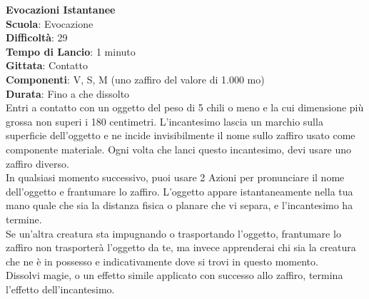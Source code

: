 \begin{multicols}{2}
\medskip\textbf{Evocazioni Istantanee}\\
\textbf{Scuola}: Evocazione\\
\textbf{Difficoltà}: 29\\
\textbf{Tempo di Lancio}: 1 minuto\\
\textbf{Gittata}: Contatto\\
\textbf{Componenti}: V, S, M (uno zaffiro del valore di 1.000 mo)\\
\textbf{Durata}: Fino a che dissolto \\
Entri a contatto con un oggetto del peso di 5 chili o meno e la cui dimensione più grossa non superi i 180 centimetri. L'incantesimo lascia un marchio sulla superficie dell'oggetto e ne incide invisibilmente il nome sullo zaffiro usato come componente materiale. Ogni volta che lanci questo incantesimo, devi usare uno zaffiro diverso.\\
In qualsiasi momento successivo, puoi usare 2 Azioni per pronunciare il nome dell'oggetto e frantumare lo zaffiro. L'oggetto appare istantaneamente nella tua mano quale che sia la distanza fisica o planare che vi separa, e l'incantesimo ha termine.\\
Se un'altra creatura sta impugnando o trasportando l'oggetto, frantumare lo zaffiro non trasporterà l'oggetto da te, ma invece apprenderai chi sia la creatura che ne è in possesso e indicativamente dove si trovi in questo momento.\\
Dissolvi magie, o un effetto simile applicato con successo allo zaffiro, termina l'effetto dell'incantesimo. 


\end{multicols}
